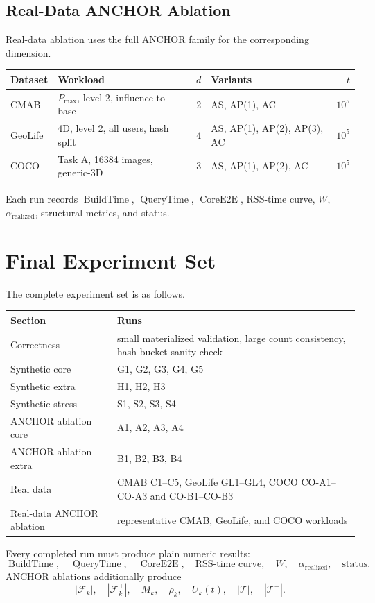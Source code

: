 \documentclass[11pt]{article}
\newcommand{\ANCHOR}{\textsc{ANCHOR}}
\newcommand{\AC}{\textsc{AC}}
\newcommand{\AS}{\textsc{AS}}
\newcommand{\AP}{\textsc{AP}}
\newcommand{\BuildTime}{\ensuremath{\operatorname{BuildTime}}}
\newcommand{\QueryTime}{\ensuremath{\operatorname{QueryTime}}}
\newcommand{\CoreE}{\ensuremath{\operatorname{CoreE2E}}}
\begin{document}
\subsection{Real-Data \ANCHOR{} Ablation}
Real-data ablation uses the full \ANCHOR{} family for the corresponding dimension.

\begin{center}
\small
\begin{tabularx}{\linewidth}{@{}l Y r Y r@{}}
\toprule
Dataset & Workload & $d$ & Variants & $t$ \\
\midrule
CMAB & $P_{\max}$, level 2, influence-to-base & 2 & \AS, \AP(1), \AC & $10^5$ \\
GeoLife & 4D, level 2, all users, hash split & 4 & \AS, \AP(1), \AP(2), \AP(3), \AC & $10^5$ \\
COCO & Task A, 16384 images, generic-3D & 3 & \AS, \AP(1), \AP(2), \AC & $10^5$ \\
\bottomrule
\end{tabularx}
\end{center}

Each run records \BuildTime, \QueryTime, \CoreE, RSS-time curve, $W$, $\alpha_{\mathrm{realized}}$, structural metrics, and status.

\section{Final Experiment Set}
The complete experiment set is as follows.

\begin{center}
\small
\begin{tabularx}{\linewidth}{@{}lY@{}}
\toprule
Section & Runs \\
\midrule
Correctness & small materialized validation, large count consistency, hash-bucket sanity check \\
Synthetic core & G1, G2, G3, G4, G5 \\
Synthetic extra & H1, H2, H3 \\
Synthetic stress & S1, S2, S3, S4 \\
\ANCHOR{} ablation core & A1, A2, A3, A4 \\
\ANCHOR{} ablation extra & B1, B2, B3, B4 \\
Real data & CMAB C1--C5, GeoLife GL1--GL4, COCO CO-A1--CO-A3 and CO-B1--CO-B3 \\
Real-data \ANCHOR{} ablation & representative CMAB, GeoLife, and COCO workloads \\
\bottomrule
\end{tabularx}
\end{center}

Every completed run must produce plain numeric results:
\[
\BuildTime,\quad
\QueryTime,\quad
\CoreE,\quad
\text{RSS-time curve},\quad
W,\quad
\alpha_{\mathrm{realized}},\quad
\text{status}.
\]
\ANCHOR{} ablations additionally produce
\[
|\mathcal{F}_k|,\quad
|\mathcal{F}_k^+|,\quad
M_k,\quad
\rho_k,\quad
U_k(t),\quad
|\mathcal{T}|,\quad
|\mathcal{T}^+|.
\]
\end{document}
